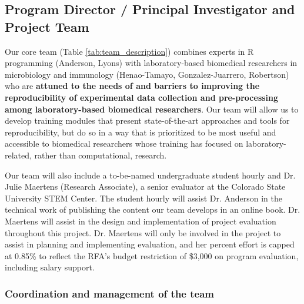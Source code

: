 \documentclass[pdftex,english,11pt,parskip=half]{scrartcl}
\begin{document}
\subsection{Program Director / Principal Investigator and Project Team}



Our core team (Table \ref{tab:team_description}) combines experts in R programming (Anderson, Lyons) with
laboratory-based biomedical researchers in microbiology and immunology
(Henao-Tamayo, Gonzalez-Juarrero, Robertson) who are \textbf{attuned to the
needs of and barriers to improving the reproducibility of experimental data
collection and pre-processing among laboratory-based biomedical researchers}.
Our team will allow us to develop training modules that present state-of-the-art
approaches and tools for reproducibility, but do so in a way that is prioritized
to be most useful and accessible to biomedical researchers whose training has
focused on laboratory-related, rather than computational, research. 

\noindent Our team will also include a to-be-named undergraduate student hourly and Dr. Julie Maertens (Research Associate), a senior evaluator
at the Colorado State University STEM Center. The student hourly will assist Dr. Anderson
in the technical work of publishing the content our team develops in an online book. 
Dr. Maertens will assist in the design and
implementation of project evaluation throughout this project. Dr. Maertens will
only be involved in the project to assist in planning and implementing
evaluation, and her percent effort is capped at 0.85\% to reflect the RFA's
budget restriction of \$3,000 on program evaluation, including salary
support.

\subsubsection*{Coordination and management of the team}


\end{document}
